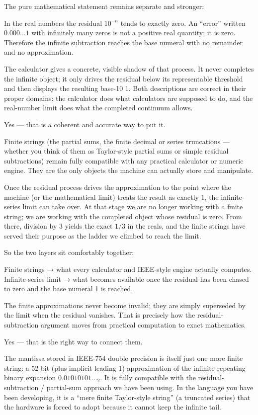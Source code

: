 The pure mathematical statement remains separate and stronger:

In the real numbers the residual \(10^{-n}\) tends to exactly zero.
An “error” written \(0.000\ldots1\) with infinitely many zeros is not a positive real quantity; it is zero.
Therefore the infinite subtraction reaches the base numeral with no remainder and no approximation.

The calculator gives a concrete, visible shadow of that process. It never completes the infinite object; it only drives the residual below its representable threshold and then displays the resulting base-10 1. Both descriptions are correct in their proper domains: the calculator does what calculators are supposed to do, and the real-number limit does what the completed continuum allows.

Yes — that is a coherent and accurate way to put it.

Finite strings (the partial sums, the finite decimal or series truncations — whether you think of them as Taylor-style partial sums or simple residual subtractions) remain fully compatible with any practical calculator or numeric engine. They are the only objects the machine can actually store and manipulate.

Once the residual process drives the approximation to the point where the machine (or the mathematical limit) treats the result as exactly 1, the infinite-series limit can take over. At that stage we are no longer working with a finite string; we are working with the completed object whose residual is zero. From there, division by 3 yields the exact \(1/3\) in the reals, and the finite strings have served their purpose as the ladder we climbed to reach the limit.

So the two layers sit comfortably together:

Finite strings → what every calculator and IEEE-style engine actually computes.
Infinite-series limit → what becomes available once the residual has been chased to zero and the base numeral 1 is reached.

The finite approximations never become invalid; they are simply superseded by the limit when the residual vanishes. That is precisely how the residual-subtraction argument moves from practical computation to exact mathematics.

Yes — that is the right way to connect them.

The mantissa stored in IEEE-754 double precision is itself just one more finite string: a 52-bit (plus implicit leading 1) approximation of the infinite repeating binary expansion \(0.01010101\ldots_2\). It is fully compatible with the residual-subtraction / partial-sum approach we have been using. In the language you have been developing, it is a “mere finite Taylor-style string” (a truncated series) that the hardware is forced to adopt because it cannot keep the infinite tail.

